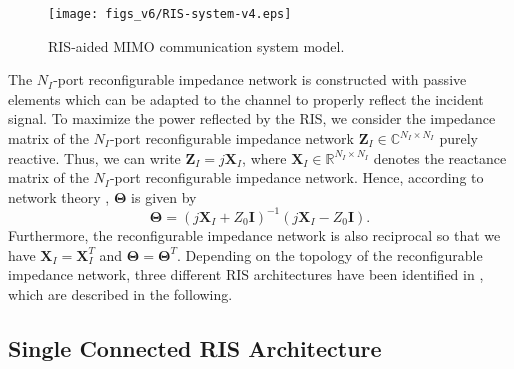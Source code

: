\documentclass[twocolumn,10pt]{IEEEtran}
\begin{document}
\begin{figure}[t]
    \centering
    \texttt{[image: figs\_v6/RIS-system-v4.eps]}
    \caption{RIS-aided MIMO communication system model.}
    \label{fig:ris-system}
\end{figure}

The $N_{I}$-port reconfigurable impedance network is constructed with passive elements which can be adapted to the channel to properly reflect the incident signal.
To maximize the power reflected by the RIS, we consider the impedance matrix of the $N_{I}$-port reconfigurable impedance network $\mathbf{Z}_{I}\in\mathbb{C}^{N_{I}\times N_{I}}$ purely reactive.
Thus, we can write $\mathbf{Z}_{I}=j\mathbf{X}_{I}$, where $\mathbf{X}_{I}\in\mathbb{R}^{N_{I}\times N_{I}}$ denotes the reactance matrix of the $N_{I}$-port reconfigurable impedance network.
Hence, according to network theory \cite{poz11}, $\boldsymbol{\Theta}$ is given by
\begin{equation}
\boldsymbol{\Theta}=\left(j\mathbf{X}_{I}+Z_{0}\mathbf{I}\right)^{-1}\left(j\mathbf{X}_{I}-Z_{0}\mathbf{I}\right).\label{eq:T(X)}
\end{equation}
Furthermore, the reconfigurable impedance network is also reciprocal so that we have $\mathbf{X}_{I}=\mathbf{X}_{I}^{T}$ and $\boldsymbol{\Theta}=\boldsymbol{\Theta}^{T}$.
Depending on the topology of the reconfigurable impedance network, three different RIS architectures have been identified in \cite{she20}, which are described in the following.

\subsection{Single Connected RIS Architecture}
\end{document}
